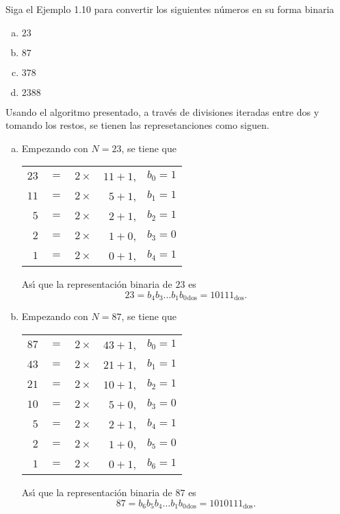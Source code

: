\begin{enunciado}
 Siga el Ejemplo 1.10 para convertir los siguientes n\'umeros en su forma binaria
 \begin{multicols}{4}
  \begin{enumerate}[(a)]
   \item $23$
   \item $87$
   \item $378$
   \item $2388$
  \end{enumerate}
 \end{multicols}
\end{enunciado}

\begin{solucion}
 Usando el algoritmo presentado, a trav\'es de divisiones iteradas entre dos y tomando los restos, se tienen las represetanciones como siguen.
 \begin{enumerate}[(a)]
  \item Empezando con $N=23$, se tiene que
  \begin{center}
   \begin{tabular}{rclrr}
    $23$ & $=$ & $2\times$ & $11+1$, & $b_0 = 1$ \\
    $11$ & $=$ & $2\times$ & $5 +1$, & $b_1 = 1$ \\
    $5$  & $=$ & $2\times$ & $2 +1$, & $b_2 = 1$ \\
    $2$  & $=$ & $2\times$ & $1 +0$, & $b_3 = 0$ \\
    $1$  & $=$ & $2\times$ & $0 +1$, & $b_4 = 1$
   \end{tabular}
  \end{center}
  As\'{\i} que la representaci\'on binaria de $23$ es
  \begin{equation*}
   23 = b_4 b_3 \ldots b_1b_{0}{}_{\text{dos}} = 10111_{\text{dos}}.
  \end{equation*}

  \item Empezando con $N=87$, se tiene que
  \begin{center}
   \begin{tabular}{rclrr}
    $87$ & $=$ & $2\times$ & $43+1$, & $b_0 = 1$ \\
    $43$ & $=$ & $2\times$ & $21 +1$, & $b_1 = 1$ \\
    $21$ & $=$ & $2\times$ & $10+1$, & $b_2 = 1$ \\
    $10$ & $=$ & $2\times$ & $5 +0$, & $b_3 = 0$ \\
    $5$  & $=$ & $2\times$ & $2 +1$, & $b_4 = 1$ \\
    $2$  & $=$ & $2\times$ & $1 +0$, & $b_5 = 0$ \\
    $1$  & $=$ & $2\times$ & $0 +1$, & $b_6 = 1$
   \end{tabular}
  \end{center}
  As\'{\i} que la representaci\'on binaria de $87$ es
  \begin{equation*}
   87 = b_6 b_5 b_4 \ldots b_1b_{0}{}_{\text{dos}} = 1010111_{\text{dos}}.
  \end{equation*}


\end{enumerate}
\end{solucion}
